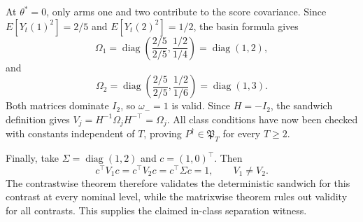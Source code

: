 At \(\theta^*=0\), only arms one and two contribute to the score covariance. Since \(E[Y_t(1)^2]=2/5\) and \(E[Y_t(2)^2]=1/2\), the basin formula gives
\[
 \Omega_1
 =\operatorname{diag}\left(\frac{2/5}{2/5},\frac{1/2}{1/4}\right)
 =\operatorname{diag}(1,2),
\]
and
\[
 \Omega_2
 =\operatorname{diag}\left(\frac{2/5}{2/5},\frac{1/2}{1/6}\right)
 =\operatorname{diag}(1,3).
\]
Both matrices dominate \(I_2\), so \(\omega_-=1\) is valid. Since \(H=-I_2\), the sandwich definition gives \(V_j=H^{-1}\Omega_jH^{-\top}=\Omega_j\). All class conditions have now been checked with constants independent of \(T\), proving \(P^\dagger\in\mathfrak P_T\) for every \(T\ge2\).

Finally, take \(\Sigma=\operatorname{diag}(1,2)\) and \(c=(1,0)^\top\). Then
\[
 c^\top V_1c=c^\top V_2c=c^\top\Sigma c=1,
 \qquad V_1\ne V_2.
\]
The contrastwise theorem therefore validates the deterministic sandwich for this contrast at every nominal level, while the matrixwise theorem rules out validity for all contrasts. This supplies the claimed in-class separation witness.